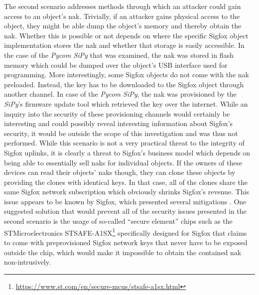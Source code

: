 The second scenario addresses methods through which an attacker could gain access to an object's \gls{nak}.
Trivially, if an attacker gains physical access to the object, they might be able dump the object's memory and thereby obtain the \gls{nak}.
Whether this is possible or not depends on where the specific Sigfox object implementation stores the \gls{nak} and whether that storage is easily accessible.
In the case of the \textit{Pycom SiPy} that was examined, the \gls{nak} was stored in flash memory which could be dumped over the object's USB interface used for programming.
More interestingly, some Sigfox objects do not come with the \gls{nak} preloaded.
Instead, the key has to be downloaded to the Sigfox object through another channel.
In case of the \textit{Pycom SiPy}, the \gls{nak} was provisioned by the \textit{SiPy}'s firmware update tool which retrieved the key over the internet.
While an inquiry into the security of these provisioning channels would certainly be interesting and could possibly reveal interesting information about Sigfox's security, it would be outside the scope of this investigation and was thus not performed.
While this scenario is not a very practical threat to the integrity of Sigfox uplinks, it is clearly a threat to Sigfox's business model which depends on being able to essentially sell \glspl{nak} for individual objects.
If the owners of these devices can read their objects' \glspl{nak} though, they can clone these objects by providing the clones with identical keys.
In that case, all of the clones share the same Sigfox network subscription which obviously shrinks Sigfox's revenue.
This issue appears to be known by Sigfox, which presented several mitigations \cite[chapter 5]{sigfox_secure}.
One suggested solution that would prevent all of the security issues presented in the second scenario is the usage of so-called ``secure element'' chips such as the STMicroelectronics STSAFE-A1SX\footnote{\url{https://www.st.com/en/secure-mcus/stsafe-a1sx.html}} specifically designed for Sigfox that claims to come with preprovisioned Sigfox network keys that never have to be exposed outside the chip, which would make it impossible to obtain the contained \gls{nak} non-intrusively.

